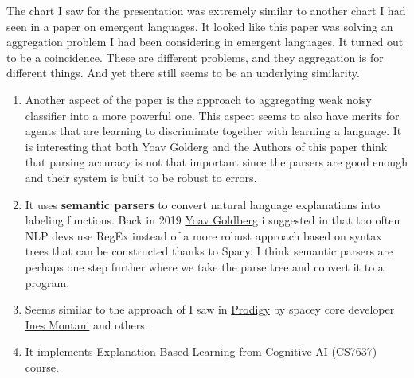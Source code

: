 \documentclass[
  letterpaper,
  DIV=11,
  numbers=noendperiod,
  oneside]{scrartcl}
\providecommand{\tightlist}{%
  \setlength{\itemsep}{0pt}\setlength{\parskip}{0pt}}
\begin{document}
The chart I saw for the presentation was extremely similar to another
chart I had seen in a paper on emergent languages. It looked like this
paper was solving an aggregation problem I had been considering in
emergent languages. It turned out to be a coincidence. These are
different problems, and they aggregation is for different things. And
yet there still seems to be an underlying similarity.

\begin{enumerate}
\def\labelenumi{\arabic{enumi}.}
\tightlist
\item
  Another aspect of the paper is the approach to aggregating weak noisy
  classifier into a more powerful one. This aspect seems to also have
  merits for agents that are learning to discriminate together with
  learning a language. It is interesting that both Yoav Golderg and the
  Authors of this paper think that parsing accuracy is not that
  important since the parsers are good enough and their system is built
  to be robust to errors.
\item
  It uses \textbf{semantic parsers} to convert natural language
  explanations into labeling functions. Back in 2019
  \href{https://youtu.be/e12danHhlic?t=853}{Yoav Goldberg} i suggested
  in that too often NLP devs use RegEx instead of a more robust approach
  based on syntax trees that can be constructed thanks to Spacy. I think
  semantic parsers are perhaps one step further where we take the parse
  tree and convert it to a program.
\item
  Seems similar to the approach of I saw in
  \href{https://explosion.ai/blog/prodigy-annotation-tool-active-learning}{Prodigy}
  by spacey core developer \href{https://ines.io/}{Ines Montani} and
  others.
\item
  It implements
  \href{https://orenbochman.github.io/blog/notes/cognitivie-ai-cs7637/17-explanation-based-learning/17-explanation-based-learning.html}{Explanation-Based
  Learning} from Cognitive AI (CS7637) course.
\end{enumerate}
\end{document}
